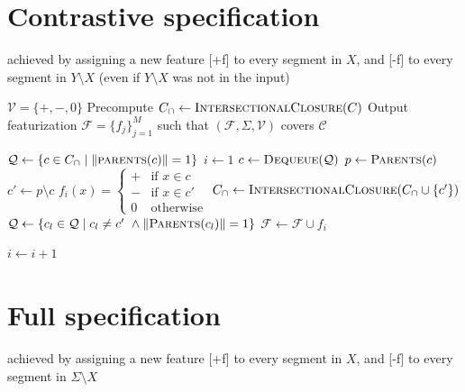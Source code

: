 \documentclass[11pt, oneside]{article}   	%
\begin{document}
\section{Contrastive specification}
achieved by assigning a new feature [+f] to every segment in $X$, and [-f] to every segment in $Y \setminus X$ (even if $Y \setminus X$ was not in the input)

\vspace{\baselineskip} \noindent \begin{algorithmic}
	\REQUIRE $\mathcal V = \{ +, -, 0 \}$
	\REQUIRE Precompute $C_\cap \leftarrow \textsc{IntersectionalClosure}(C)$
	\ENSURE Output featurization $\mathcal F = \{ f_j \}_{j=1}^M$ such that $(\mathcal F, \Sigma, \mathcal V)$ covers $\mathcal C$
	
	\STATE
	\STATE $\mathcal Q \leftarrow \{c \in C_\cap \mid \Vert\textsc{parents}(c)\Vert = 1 \}$
	\STATE $i \leftarrow 1$
	\STATE
	\STATE $c \leftarrow \textsc{Dequeue}(\mathcal Q)$
	\STATE $p \leftarrow \textsc{Parents}(c)$
	\STATE $c' \leftarrow p \setminus c$
	\STATE $f_i(x) = \begin{cases}
	+ & \mbox{if } x \in c \\
	- & \mbox{if } x \in c' \\
	0 & \mbox{otherwise}
	\end{cases} $
	\STATE $C_\cap \leftarrow \textsc{IntersectionalClosure}(C_\cap \cup \{c'\})$
	\STATE $\mathcal Q \leftarrow \{c_l \in \mathcal Q \mid c_l \not= c' \ \land \Vert \textsc{Parents}(c_l) \Vert = 1 \}$
	\STATE $\mathcal F \leftarrow \mathcal F \cup f_i$
	
	\STATE $i \leftarrow i + 1$
	\ENDWHILE
\end{algorithmic}

\section{Full specification}
achieved by assigning a new feature [+f] to every segment in $X$, and [-f] to every segment in $\Sigma \setminus X$
\end{document}
